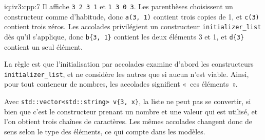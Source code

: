 \begin{solution}{iq:iv3:cpp:7}
Il affiche \texttt{3 2 3 1} et \texttt{1 3 0 3}. Les parenthèses choisissent un constructeur comme d'habitude, donc \texttt{a(3, 1)} contient trois copies de 1, et \texttt{c(3)} contient trois zéros. Les accolades privilégient un constructeur \texttt{initializer\_list} dès qu'il s'applique, donc \texttt{b\{3, 1\}} contient les deux éléments 3 et 1, et \texttt{d\{3\}} contient un seul élément.

\begin{sloppypar}La règle est que l'initialisation par accolades examine d'abord les constructeurs \texttt{initializer\_list}, et ne considère les autres que si aucun n'est viable. Ainsi, pour tout conteneur de nombres, les accolades signifient «~ces éléments~».\end{sloppypar}

Avec \texttt{std::vector<std::string> v\{3, \textquotedbl{}x\textquotedbl{}\}}, la liste ne peut pas se convertir, si bien que c'est le constructeur prenant un nombre et une valeur qui est utilisé, et l'on obtient trois chaînes de caractères. Les mêmes accolades changent donc de sens selon le type des éléments, ce qui compte dans les modèles.

\end{solution}

